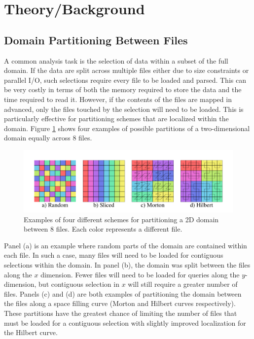 \documentclass[apjl]{emulateapj}
\newcommand{\todo}[1]{{\color{red}{#1}}}
\newcommand{\addref}{{\color{red}(ref. needed)}}
\begin{document}
\section{Theory/Background}\label{S:theory}

\subsection{Domain Partitioning Between Files}\label{SS:decomp}
A common analysis task is the selection of data within a subset of the full domain. If the data are split across multiple files either due to size constraints or parallel I/O, such selections require every file to be loaded and parsed. This can be very costly in terms of both the memory required to store the data and the time required to read it. However, if the contents of the files are mapped in advanced, only the files touched by the selection will need to be loaded. This is particularly effective for partitioning schemes that are localized within the domain. Figure \ref{fig:files} shows four examples of possible partitions of a two-dimensional domain equally across 8 files. 
%
\begin{figure}[htbp]
\begin{center}
\includegraphics[width=\columnwidth,keepaspectratio]{../images/files.png}
\caption{Examples of four different schemes for partitioning a 2D domain between 8 files. Each color represents a different file.}
\label{fig:files}
\end{center}
\end{figure}
%

Panel (a) is an example where random parts of the domain are contained within each file. In such a case, many files will need to be loaded for contiguous selections within the domain. In panel (b), the domain was split between the files along the $x$ dimension. Fewer files will need to be loaded for queries along the $y$-dimension, but contiguous selection in $x$ will still require a greater number of files. Panels (c) and (d) are both examples of partitioning the domain between the files along a space filling curve (Morton and Hilbert curves respectively). These partitions have the greatest chance of limiting the number of files that must be loaded for a contiguous selection with slightly improved localization for the Hilbert curve. \todo{Examples of use cases \addref.}
\end{document}
